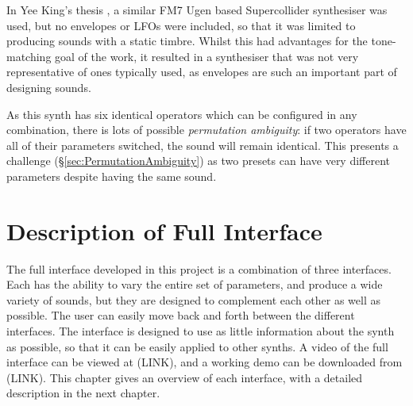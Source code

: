 \documentclass[11pt, oneside]{report}   	%
\begin{document}
In Yee King's thesis \cite{YeeKing}, a similar FM7 Ugen based Supercollider synthesiser was used, but no envelopes or LFOs were included, so that it was limited to producing sounds with a static timbre. Whilst this had advantages for the tone-matching goal of the work, it resulted in a synthesiser that was not very representative of ones typically used, as envelopes are such an important part of designing sounds. 

As this synth has six identical operators which can be configured in any combination, there is lots of possible \emph{permutation ambiguity}: if two operators have all of their parameters switched, the sound will remain identical. This presents a challenge (\S \ref{sec:PermutationAmbiguity}) as two presets can have very different parameters despite having the same sound.

\chapter{Description of Full Interface}
The full interface developed in this project is a combination of three interfaces. Each has the ability to vary the entire set of parameters, and produce a wide variety of sounds, but they are designed to complement each other as well as possible. The user can easily move back and forth between the different interfaces. The interface is designed to use as little information about the synth as possible, so that it can be easily applied to other synths. A video of the full interface can be viewed at (LINK), and a working demo can be downloaded from (LINK). This chapter gives an overview of each interface, with a detailed description in the next chapter. \vspace{-30pt}
\end{document}
